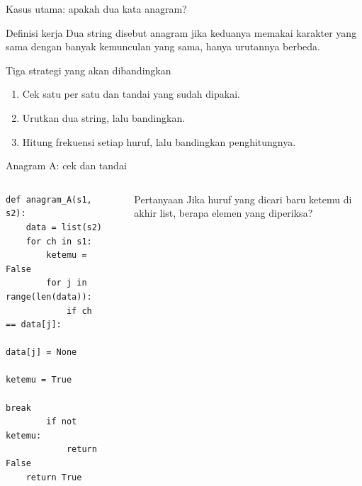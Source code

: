 \documentclass[aspectratio=169,11pt]{beamer}
\begin{document}
\begin{frame}{Kasus utama: apakah dua kata anagram?}
\begin{block}{Definisi kerja}
Dua string disebut anagram jika keduanya memakai karakter yang sama dengan banyak kemunculan yang sama, hanya urutannya berbeda.
\end{block}
\begin{center}
\end{center}
\begin{block}{Tiga strategi yang akan dibandingkan}
\begin{enumerate}
\item Cek satu per satu dan tandai yang sudah dipakai.
\item Urutkan dua string, lalu bandingkan.
\item Hitung frekuensi setiap huruf, lalu bandingkan penghitungnya.
\end{enumerate}
\end{block}
\end{frame}

\begin{frame}[fragile]{Anagram A: cek dan tandai}
\begin{columns}[T]
\begin{lstlisting}[basicstyle=\ttfamily\scriptsize]
def anagram_A(s1, s2):
    data = list(s2)
    for ch in s1:
        ketemu = False
        for j in range(len(data)):
            if ch == data[j]:
                data[j] = None
                ketemu = True
                break
        if not ketemu:
            return False
    return True
\end{lstlisting}
\begin{center}
\end{center}
\pause
\begin{block}{Pertanyaan}
Jika huruf yang dicari baru ketemu di akhir list, berapa elemen yang diperiksa?
\end{block}
\end{columns}
\end{frame}
\end{document}
